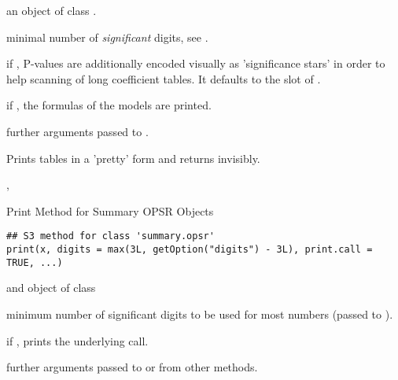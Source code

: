 \documentclass[letterpaper]{book}
\begin{document}
\begin{Arguments}
\begin{ldescription}
\item[\code{x}] an object of class .

\item[\code{digits}] minimal number of \emph{significant} digits, see .

\item[\code{signif.stars}] if , P-values are additionally encoded visually
as 'significance stars' in order to help scanning of long coefficient tables.
It defaults to the  slot of .

\item[\code{print.formula}] if , the formulas of the models are printed.

\item[\code{...}] further arguments passed to .
\end{ldescription}
\end{Arguments}
%
\begin{Value}
Prints tables in a 'pretty' form and returns  invisibly.
\end{Value}
%
\begin{SeeAlso}
, 
\end{SeeAlso}
%
\begin{Description}
Print Method for Summary OPSR Objects
\end{Description}
%
\begin{Usage}
\begin{verbatim}
## S3 method for class 'summary.opsr'
print(x, digits = max(3L, getOption("digits") - 3L), print.call = TRUE, ...)
\end{verbatim}
\end{Usage}
%
\begin{Arguments}
\begin{ldescription}
\item[\code{x}] and object of class 

\item[\code{digits}] minimum number of significant digits to be used for most numbers (passed to ).

\item[\code{print.call}] if , prints the underlying  call.

\item[\code{...}] further arguments passed to or from other methods.
\end{ldescription}
\end{Arguments}
\end{document}
